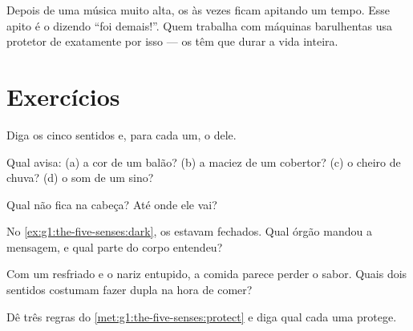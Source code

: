 \begin{example}\label{ex:g1:the-five-senses:loud}
Depois de uma música muito alta, os  às vezes ficam apitando
um tempo. Esse apito é o  dizendo ``foi demais!''. Quem
trabalha com máquinas barulhentas usa protetor de  exatamente
por isso --- os  têm que durar a vida inteira.
\end{example}

\section{Exercícios}

\begin{exercise}[$\star$]\label{exo:g1:the-five-senses:1}
Diga os cinco sentidos e, para cada um, o  dele.
\end{exercise}

\begin{exercise}[$\star$]\label{exo:g1:the-five-senses:2}
Qual  avisa: (a) a cor de um balão? (b) a maciez de
um cobertor? (c) o cheiro de chuva? (d) o som de um sino?
\end{exercise}

\begin{exercise}[$\star$]\label{exo:g1:the-five-senses:3}
Qual  não fica na cabeça? Até onde ele vai?
\end{exercise}

\begin{exercise}[$\star$]\label{exo:g1:the-five-senses:4}
No \cref{ex:g1:the-five-senses:dark}, os  estavam fechados.
Qual órgão mandou a mensagem, e qual parte do corpo entendeu?
\end{exercise}

\begin{exercise}[$\star$]\label{exo:g1:the-five-senses:5}
Com um resfriado e o nariz entupido, a comida parece perder o sabor.
Quais dois sentidos costumam fazer dupla na hora de comer?
\end{exercise}

\begin{exercise}[$\star$]\label{exo:g1:the-five-senses:6}
Dê três regras do \cref{met:g1:the-five-senses:protect} e diga qual
 cada uma protege.
\end{exercise}

